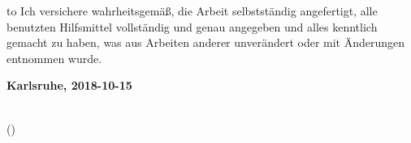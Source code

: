 
\thispagestyle{empty}
\null\vfill
\noindent\hbox to \textwidth{\hrulefill} 
%
{Ich versichere wahrheitsgemäß, die Arbeit
selbstständig angefertigt, alle benutzten Hilfsmittel vollständig und genau
angegeben und alles kenntlich gemacht zu haben, was aus Arbeiten anderer
unverändert oder mit Änderungen entnommen wurde.}
 
 
\textbf{Karlsruhe, 2018-10-15}
\vspace{1.5cm}
 
\dotfill\hspace*{8.0cm}\\
\hspace*{2cm}(\theauthor) 
\cleardoublepage
